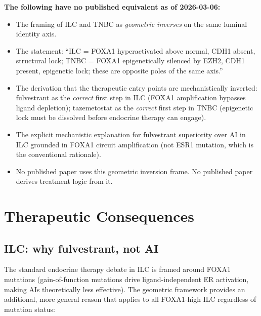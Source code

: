 \documentclass[12pt, a4paper]{article}
\begin{document}
\begin{center}
\colorbox{novelbox}{
\begin{minipage}{0.88\textwidth}
\vspace{0.5em}
\textbf{The following have no published equivalent
as of 2026-03-06:}
\begin{itemize}[noitemsep]
    \item The framing of ILC and TNBC as
    \textit{geometric inverses} on the same
    luminal identity axis.
    \item The statement: ``ILC = FOXA1
    hyperactivated above normal, CDH1 absent,
    structural lock; TNBC = FOXA1 epigenetically
    silenced by EZH2, CDH1 present, epigenetic
    lock; these are opposite poles of the same
    axis.''
    \item The derivation that the therapeutic
    entry points are mechanistically inverted:
    fulvestrant as the \textit{correct} first
    step in ILC (FOXA1 amplification bypasses
    ligand depletion); tazemetostat as the
    \textit{correct} first step in TNBC
    (epigenetic lock must be dissolved before
    endocrine therapy can engage).
    \item The explicit mechanistic explanation
    for fulvestrant superiority over AI in ILC
    grounded in FOXA1 circuit amplification
    (not ESR1 mutation, which is the conventional
    rationale).
    \item No published paper uses this geometric
    inversion frame. No published paper derives
    treatment logic from it.
\end{itemize}
\vspace{0.5em}
\end{minipage}}
\end{center}

\section{Therapeutic Consequences}

\subsection{ILC: why fulvestrant, not AI}

The standard endocrine therapy debate in ILC is
framed around FOXA1 mutations (gain-of-function
mutations drive ligand-independent ER activation,
making AIs theoretically less effective). The
geometric framework provides an additional, more
general reason that applies to all FOXA1-high ILC
regardless of mutation status:
\end{document}

